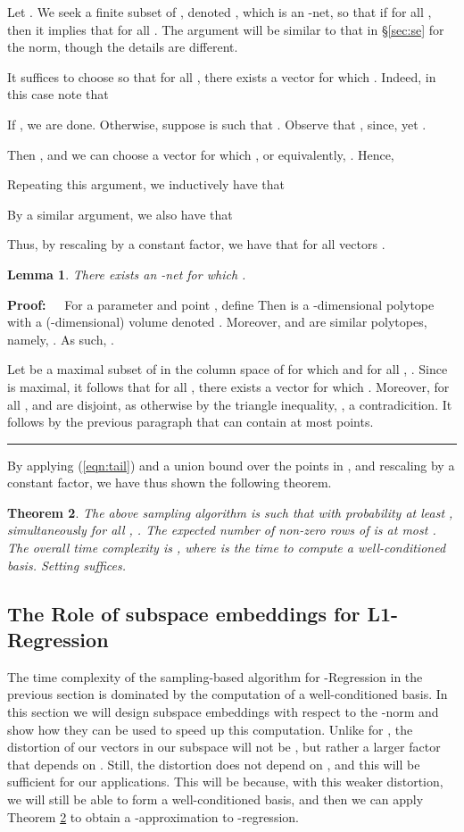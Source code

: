 \documentclass[11pt]{article}
\newtheorem{theorem}{Theorem}
\newtheorem{lemma}[theorem]{Lemma}
\newenvironment{proof}{\begin{trivlist} \item {\bf Proof:~~}}
  {\qed\end{trivlist}}
\def\qed{\hfill\rule{2mm}{2mm}}
\begin{document}
Let . We seek a finite subset of
, denoted , which is an -net, 
so that if  for all , then
it implies that  for all . The argument will be similar
to that in \S\ref{sec:se} for the  norm, though the details are different. 

It suffices to choose  so that for all , 
there exists a vector  for which .
Indeed, in this case note that 

If , we are done. Otherwise, suppose  is such that . 
Observe that , since,  yet . 

Then , and we can
choose a vector  for which , or equivalently,
. Hence,

Repeating this argument, we inductively have that 

By a similar argument, we also have that

Thus, by rescaling  by a constant factor, we have that  
for all vectors . 

\begin{lemma}\label{lem:eps-net}
There exists an -net  for which . 
\end{lemma}
\begin{proof}
For a parameter  and point , 
define 
Then  is a -dimensional polytope with a (-dimensional) volume denoted . 
Moreover, 
 and  are similar polytopes, namely, . 
As such, . 

Let  be a maximal subset of  in the column space of  for which  and 
for all , . Since  is maximal, it follows that for all 
,
there exists a vector  for which . 
Moreover, for all , 
 and  are disjoint, 
as otherwise by the triangle inequality, , a contradicition. 
It follows by the previous paragraph that  can contain at most  points. 
\end{proof}

By applying (\ref{eqn:tail}) and a union bound over the points in , and rescaling  by a constant factor, we have thus
shown the following theorem.
\begin{theorem}\label{thm:slow}
The above sampling algorithm is such that with probability at least , simultaneously for all ,
. The expected number of non-zero rows of  is at most . The 
overall time complexity is , where  is the time to compute a well-conditioned basis. Setting
 suffices. 
\end{theorem}

\subsection{The Role of subspace embeddings for L1-Regression}\label{sec:l1Subspace}
The time complexity of the sampling-based algorithm for -Regression in the previous section is dominated by the computation of 
a well-conditioned basis. In this section we will design subspace embeddings with respect to the -norm and show how they 
can be used to speed up this computation. Unlike for , the distortion of our vectors in our subspace will not be , but
rather a larger factor that depends on . Still, the distortion does not depend on , and this will be sufficient for our applications. This
will be because, with this weaker distortion, we will still be able to form a well-conditioned basis, and then we can apply 
Theorem \ref{thm:slow} to obtain a -approximation to -regression. 
\end{document}
